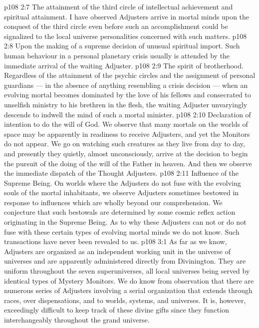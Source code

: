 \vs p108 2:7 \bibnobreakspace The attainment of the third circle of intellectual achievement and spiritual attainment. I have observed Adjusters arrive in mortal minds upon the conquest of the third circle even before such an accomplishment could be signalized to the local universe personalities concerned with such matters.
\vs p108 2:8 \bibnobreakspace Upon the making of a supreme decision of unusual spiritual import. Such human behaviour in a personal planetary crisis usually is attended by the immediate arrival of the waiting Adjuster.
\vs p108 2:9 \bibnobreakspace The spirit of brotherhood. Regardless of the attainment of the psychic circles and the assignment of personal guardians --- in the absence of anything resembling a crisis decision --- when an evolving mortal becomes dominated by the love of his fellows and consecrated to unselfish ministry to his brethren in the flesh, the waiting Adjuster unvaryingly descends to indwell the mind of such a mortal minister.
\vs p108 2:10 \bibnobreakspace Declaration of intention to do the will of God. We observe that many mortals on the worlds of space may be apparently in readiness to receive Adjusters, and yet the Monitors do not appear. We go on watching such creatures as they live from day to day, and presently they quietly, almost unconsciously, arrive at the decision to begin the pursuit of the doing of the will of the Father in heaven. And then we observe the immediate dispatch of the Thought Adjusters.
\vs p108 2:11 \bibnobreakspace Influence of the Supreme Being. On worlds where the Adjusters do not fuse with the evolving souls of the mortal inhabitants, we observe Adjusters sometimes bestowed in response to influences which are wholly beyond our comprehension. We conjecture that such bestowals are determined by some cosmic reflex action originating in the Supreme Being. As to why these Adjusters can not or do not fuse with these certain types of evolving mortal minds we do not know. Such transactions have never been revealed to us.
\vs p108 3:1 As far as we know, Adjusters are organized as an independent working unit in the universe of universes and are apparently administered directly from Divinington. They are uniform throughout the seven superuniverses, all local universes being served by identical types of Mystery Monitors. We do know from observation that there are numerous series of Adjusters involving a serial organization that extends through races, over dispensations, and to worlds, systems, and universes. It is, however, exceedingly difficult to keep track of these divine gifts since they function interchangeably throughout the grand universe.
